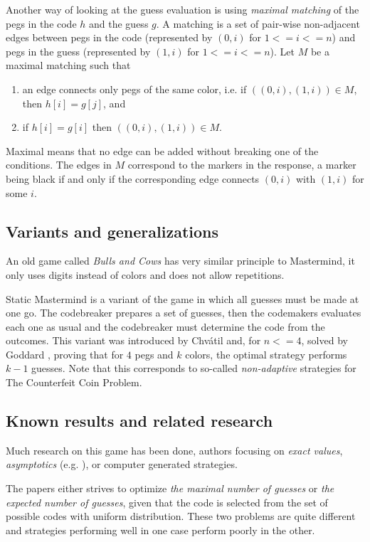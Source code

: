 Another way of looking at the guess evaluation is using
  \emph{maximal matching} of the pegs in the code $h$ and the guess $g$.
A matching is a set of pair-wise non-adjacent edges between
  pegs in the code (represented by $(0,i)$ for $1<=i<=n$) and
  pegs in the guess (represented by $(1,i)$ for $1<=i<=n$).
Let $M$ be a maximal matching such that
\begin{enumerate}
\item an edge connects only pegs of the same color, i.e. if $((0,i),(1,i))\in M$, then $h[i] = g[j]$, and
\item if $h[i] = g[i]$ then $((0,i),(1,i))\in M$.
\end{enumerate}
Maximal means that no edge can be added without breaking one of the conditions.
The edges in $M$ correspond to the markers in the response,
  a marker being black if and only if the corresponding edge connects $(0,i)$
  with $(1,i)$ for some $i$.

\subsection{Variants and generalizations}

An old game called \emph{Bulls and Cows} has very similar principle to Mastermind,
  it only uses digits instead of colors and does not allow repetitions.

Static Mastermind is a variant of the game in which all guesses
  must be made at one go.
The codebreaker prepares a set of guesses,
  then the codemakers evaluates each one as usual and
  the codebreaker must determine the code from the outcomes.
This variant was introduced by Chvátil\cite{mm-chvatil} and,
  for $n <= 4$, solved by Goddard \cite{mm-static},
  proving that for $4$ pegs and $k$ colors,
  the optimal strategy performs $k-1$ guesses.
Note that this corresponds to so-called \emph{non-adaptive} strategies
  for The Counterfeit Coin Problem.

\subsection{Known results and related research}

Much research on this game has been done, authors focusing
  on \emph{exact values}, \emph{asymptotics} (e.g. \cite{mm-chvatil}), or
  computer generated strategies.

The papers either strives to optimize \emph{the maximal number of guesses}
  or \emph{the expected number of guesses}, given that the code
  is selected from the set of possible codes with uniform distribution.
These two problems are quite different and strategies performing well
  in one case perform poorly in the other.

